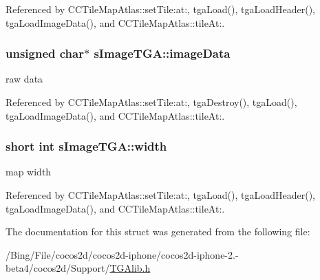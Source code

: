 Referenced by C\-C\-Tile\-Map\-Atlas\-::set\-Tile\-:at\-:, tga\-Load(), tga\-Load\-Header(), tga\-Load\-Image\-Data(), and C\-C\-Tile\-Map\-Atlas\-::tile\-At\-:.

\hypertarget{structs_image_t_g_a_a71375192650ba847a14e1d86988952a8}{
\subsubsection[{image\-Data}]{\setlength{\rightskip}{0pt plus 5cm}unsigned char$\ast$ {\bf s\-Image\-T\-G\-A\-::image\-Data}}}\label{structs_image_t_g_a_a71375192650ba847a14e1d86988952a8}
raw data 

Referenced by C\-C\-Tile\-Map\-Atlas\-::set\-Tile\-:at\-:, tga\-Destroy(), tga\-Load(), tga\-Load\-Image\-Data(), and C\-C\-Tile\-Map\-Atlas\-::tile\-At\-:.

\hypertarget{structs_image_t_g_a_a1b463569e691f02be0f05d0e095bef19}{
\subsubsection[{width}]{\setlength{\rightskip}{0pt plus 5cm}short int {\bf s\-Image\-T\-G\-A\-::width}}}\label{structs_image_t_g_a_a1b463569e691f02be0f05d0e095bef19}
map width 

Referenced by C\-C\-Tile\-Map\-Atlas\-::set\-Tile\-:at\-:, tga\-Load(), tga\-Load\-Header(), tga\-Load\-Image\-Data(), and C\-C\-Tile\-Map\-Atlas\-::tile\-At\-:.



The documentation for this struct was generated from the following file\-:\begin{DoxyCompactItemize}
\item 
/\-Bing/\-File/cocos2d/cocos2d-\/iphone/cocos2d-\/iphone-\/2.-\/beta4/cocos2d/\-Support/\hyperlink{_t_g_alib_8h}{T\-G\-Alib.\-h}\end{DoxyCompactItemize}
